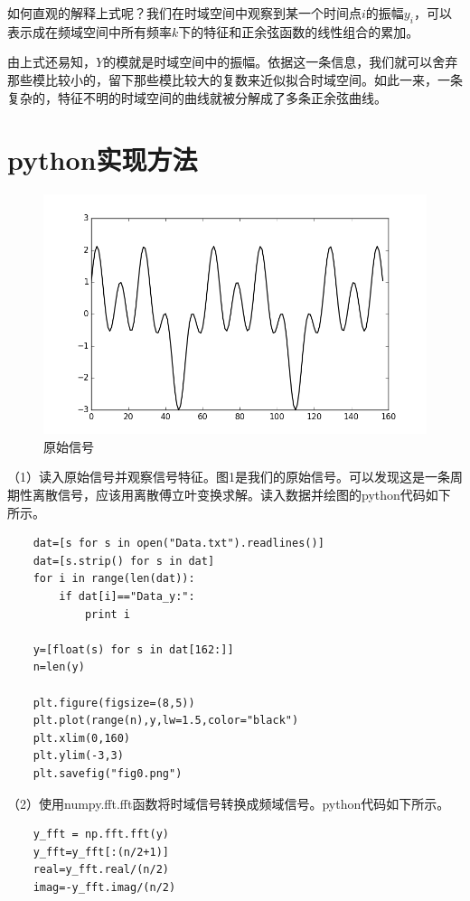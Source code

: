\documentclass[12pt,a4paper,onecolumn]{article}
\begin{document}
如何直观的解释上式呢？我们在时域空间中观察到某一个时间点$i$的振幅$y_i$，可以表示成在频域空间中所有频率$k$下的特征和正余弦函数的线性组合的累加。

由上式还易知，$Y$的模就是时域空间中的振幅。依据这一条信息，我们就可以舍弃那些模比较小的，留下那些模比较大的复数来近似拟合时域空间。如此一来，一条复杂的，特征不明的时域空间的曲线就被分解成了多条正余弦曲线。

\section{python实现方法}

\begin{figure}[H]
	\centering
	\includegraphics[width=400pt]{fig0.png}
	\caption{原始信号}
\end{figure}

（1）读入原始信号并观察信号特征。图1是我们的原始信号。可以发现这是一条周期性离散信号，应该用离散傅立叶变换求解。读入数据并绘图的python代码如下所示。

\begin{lstlisting}
	dat=[s for s in open("Data.txt").readlines()]
	dat=[s.strip() for s in dat]
	for i in range(len(dat)):
	    if dat[i]=="Data_y:":
	        print i

	y=[float(s) for s in dat[162:]]
	n=len(y)

	plt.figure(figsize=(8,5))
	plt.plot(range(n),y,lw=1.5,color="black")
	plt.xlim(0,160)
	plt.ylim(-3,3)
	plt.savefig("fig0.png")
\end{lstlisting}

（2）使用numpy.fft.fft函数将时域信号转换成频域信号。python代码如下所示。

\begin{lstlisting}
	y_fft = np.fft.fft(y)
	y_fft=y_fft[:(n/2+1)]
	real=y_fft.real/(n/2)
	imag=-y_fft.imag/(n/2)
\end{lstlisting}
\end{document}
